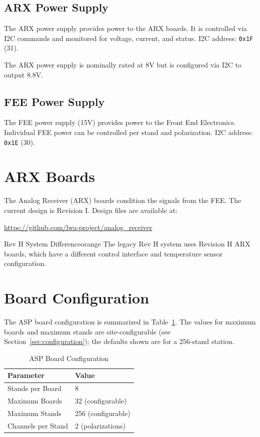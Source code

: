 \subsection{ARX Power Supply}

The ARX power supply provides power to the ARX boards. It is controlled via I2C commands and monitored for voltage, current, and status. I2C address: \texttt{0x1F} (31).

\begin{noteBox}
The ARX power supply is nominally rated at 8V but is configured via I2C to output 8.8V.
\end{noteBox}

\subsection{FEE Power Supply}

The FEE power supply (15V) provides power to the Front End Electronics. Individual FEE power can be controlled per stand and polarization. I2C address: \texttt{0x1E} (30).

\section{ARX Boards}

The Analog Receiver (ARX) boards condition the signals from the FEE. The current design is Revision I. Design files are available at:
\begin{center}
\url{https://github.com/lwa-project/analog_receiver}
\end{center}

\begin{calloutBox}{Rev H System Difference}{orange}
The legacy Rev H system uses Revision H ARX boards, which have a different control interface and temperature sensor configuration.
\end{calloutBox}

\section{Board Configuration}

The ASP board configuration is summarized in Table~\ref{tab:board-config}.  The values for maximum boards and maximum stands are site-configurable (see Section~\ref{sec:configuration}); the defaults shown are for a 256-stand station.

\begin{table}[htbp]
    \centering
    \caption{ASP Board Configuration}
    \label{tab:board-config}
    \begin{tabular}{ll}
        \toprule
        \textbf{Parameter} & \textbf{Value} \\
        \midrule
        Stands per Board & 8 \\
        Maximum Boards & 32 (configurable) \\
        Maximum Stands & 256 (configurable) \\
        Channels per Stand & 2 (polarizations) \\
        \bottomrule
    \end{tabular}
\end{table}
